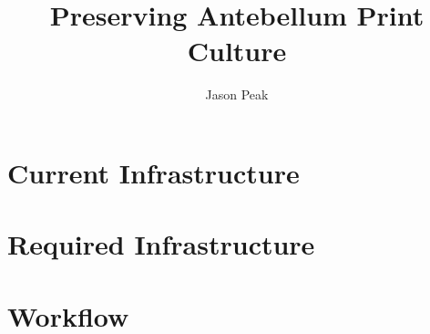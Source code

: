 \documentclass[oneside, 12pt]{article}
\begin{document}
\title{Preserving Antebellum Print Culture}
\author{Jason Peak}


\def\projectname{Poe's Magazine World}
\def\apc{Antebellum Print Culture}
\def\bwj{\emph{The Broadway Journal}}
\def\slm{\emph{Southern Literary Messenger}}
\def\bgm{\emph{Burton's Gentleman's Magazine}}
\def\gm{\emph{Graham's Magazine}}
\def\maglist{\bgm, \bwj, \gm, and the \slm}

\def\needcite{[citation]}
\def\needswork{[needs much work for inclusion]}

%

%

%




%
\section{Current Infrastructure}


\section{Required Infrastructure}



%

\section{Workflow}

\end{document}
